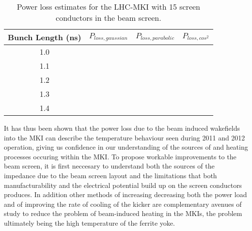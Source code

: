 \begin{table}
\label{tab:mki-15-heating}
\caption{Power loss estimates for the LHC-MKI with 15 screen conductors in the beam screen.}
\begin{center}
\begin{tabular}{c | c | c | c}
Bunch Length (ns) & $P_{loss, gaussian}$ & $P_{loss, parabolic}$ & $P_{loss, cos^{2}}$ \\ \hline
1.0 & & & \\ \hline
1.1 & & & \\ \hline
1.2 & & & \\ \hline
1.3 & & & \\ \hline
1.4 & & & \\ \hline
\end{tabular}
\end{center}
\end{table}

It has thus been shown that the power loss due to the beam induced wakefields into the MKI can describe the temperature behaviour seen during 2011 and 2012 operation, giving us confidence in our understanding of the sources of and heating processes occuring within the MKI. To propose workable improvements to the beam screen, it is first neccesary to understand both the sources of the impedance due to the beam screen layout and the limitations that both manufacturability and the electrical potential build up on the screen conductors produces. In addition other methods of increasing decreasing both the power load and of improving the rate of cooling of the kicker are complementary avenues of study to reduce the problem of beam-induced heating in the MKIs, the problem ultimately being the high temperature of the ferrite yoke.


